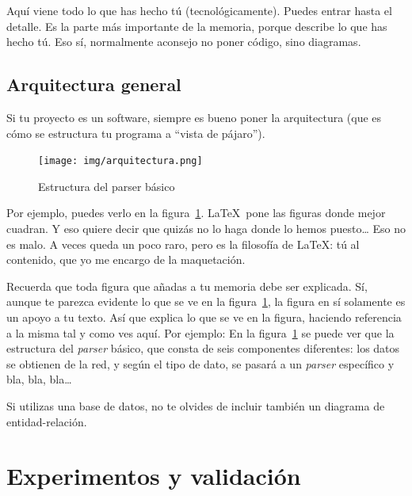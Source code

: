 \documentclass[a4paper, 12pt]{book}
\begin{document}
Aquí viene todo lo que has hecho tú (tecnológicamente). 
Puedes entrar hasta el detalle. 
Es la parte más importante de la memoria, porque describe lo que has hecho tú.
Eso sí, normalmente aconsejo no poner código, sino diagramas.



\section{Arquitectura general} 
\label{sec:arquitectura}

Si tu proyecto es un software, siempre es bueno poner la arquitectura (que es cómo se estructura tu programa a ``vista de pájaro'').

\begin{figure}
  \centering
  \texttt{[image: img/arquitectura.png]}
  \caption{Estructura del parser básico}
  \label{fig:arquitectura}
\end{figure}


Por ejemplo, puedes verlo en la figura~\ref{fig:arquitectura}.
\LaTeX \ pone las figuras donde mejor cuadran. 
Y eso quiere decir que quizás no lo haga donde lo hemos puesto\ldots 
Eso no es malo.
A veces queda un poco raro, pero es la filosofía de \LaTeX: tú al contenido, que yo me encargo de la maquetación.


 
Recuerda que toda figura que añadas a tu memoria debe ser explicada.
Sí, aunque te parezca evidente lo que se ve en la figura~\ref{fig:arquitectura}, la figura en sí solamente es un apoyo a tu texto.
Así que explica lo que se ve en la figura, haciendo referencia a la misma tal y como ves aquí.
Por ejemplo: En la figura~\ref{fig:arquitectura} se puede ver que la estructura del \emph{parser} básico, que consta de seis componentes diferentes: los datos se obtienen de la red, y según el tipo de dato, se pasará a un \emph{parser} específico y bla, bla, bla\ldots

Si utilizas una base de datos, no te olvides de incluir también un diagrama de entidad-relación.



\cleardoublepage
\chapter{Experimentos y validación}
\label{chap:experimentos}
\end{document}
